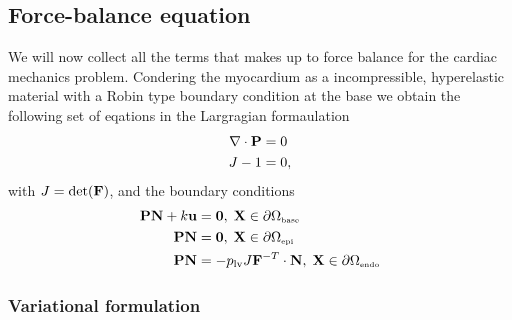 \subsection{Force-balance equation}
We will now collect all the terms that makes up to force balance for
the cardiac mechanics problem. Condering the myocardium as a incompressible,
hyperelastic material with a Robin type boundary condition at the base
we obtain the following set of eqations in the Largragian formaulation
\begin{align}
  \begin{split}
  \nabla \cdot \mathbf{P} &= 0 \\
  J - 1 &= 0,
  \end{split}
 \label{eq:force_balance_strong}
\end{align}
with $J = \det(\mathbf{F})$, and the boundary conditions
\begin{align}
  \mathbf{P} \mathbf{N} + k \mathbf{u} &= \mathbf{0},  \;  \mathbf{X} \in \partial \Omega_{ \textnormal{\tiny\text{base}}}\\
  \mathbf{P}\mathbf{N}  &= \mathbf{0}, \;  \mathbf{X} \in \partial \Omega_{ \textnormal{\tiny \text{epi}}} \\
  \mathbf{P}\mathbf{N} &= -p_{\mathrm{lv}} J\mathbf{F}^{-T} \cdot \mathbf{N}, \;  \mathbf{X} \in \partial \Omega_{ \textnormal{\tiny \text{endo}}} \\
  \label{eq:bndry_conditions_strong}
\end{align}
 


\subsubsection{Variational formulation}


